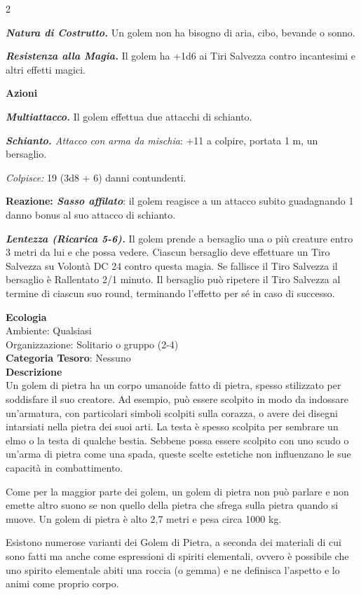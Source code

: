 \begin{multicols}{2}
{\emph{\textbf{Natura di Costrutto.}} Un golem non ha bisogno di aria, cibo, bevande o sonno.

\emph{\textbf{Resistenza alla Magia.}} Il golem ha +1d6 ai Tiri Salvezza contro incantesimi e altri effetti magici.

\textbf{Azioni}

\emph{\textbf{Multiattacco.}} Il golem effettua due attacchi di schianto.

\emph{\textbf{Schianto.} Attacco con arma da mischia}: +11 a colpire, portata 1 m, un bersaglio.

\emph{Colpisce:} 19 (3d8 + 6) danni contundenti.

\textbf{Reazione: \emph{Sasso affilato}}: il golem reagisce a un attacco subito guadagnando 1 danno bonus al suo attacco di schianto.

\emph{\textbf{Lentezza (Ricarica 5-6).}} Il golem prende a bersaglio una o più creature entro 3 metri da lui e che possa vedere. Ciascun bersaglio deve effettuare un Tiro Salvezza su Volontà DC 24 contro questa magia. Se fallisce il Tiro Salvezza il bersaglio è Rallentato 2/1 minuto. Il bersaglio può ripetere il Tiro Salvezza al termine di ciascun suo round, terminando l'effetto per sé in caso di successo.

\textbf{Ecologia}\\
Ambiente: Qualsiasi\\
Organizzazione: Solitario o gruppo (2-4)\\
\textbf{Categoria Tesoro}: Nessuno\\
\textbf{Descrizione}\\
Un golem di pietra ha un corpo umanoide fatto di pietra, spesso stilizzato per soddisfare il suo creatore. Ad esempio, può essere scolpito in modo da indossare un'armatura, con particolari simboli scolpiti sulla corazza, o avere dei disegni intarsiati nella pietra dei suoi arti. La testa è spesso scolpita per sembrare un elmo o la testa di qualche bestia. Sebbene possa essere scolpito con uno scudo o un'arma di pietra come una spada, queste scelte estetiche non influenzano le sue capacità in combattimento.

Come per la maggior parte dei golem, un golem di pietra non può parlare e non emette altro suono se non quello della pietra che sfrega sulla pietra quando si muove. Un golem di pietra è alto 2,7 metri e pesa circa 1000 kg.

Esistono numerose varianti dei Golem di Pietra, a seconda dei materiali di cui sono fatti ma anche come espressioni di spiriti elementali, ovvero è possibile che uno spirito elementale abiti una roccia (o gemma) e ne definisca l'aspetto e lo animi come proprio corpo.

}
\end{multicols}
